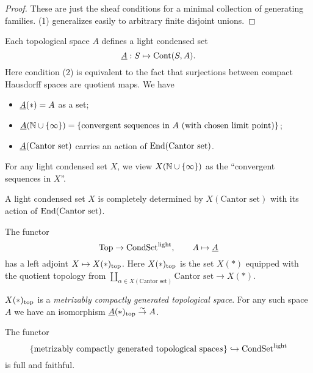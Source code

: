 \documentclass{notes}
\begin{document}
{\luca

\begin{proof}
	These are just the sheaf conditions for a minimal collection of generating families.
	(1) generalizes easily to arbitrary finite disjoint unions.
\end{proof}
}

\begin{example}
Each topological space $A$ defines a light condensed set 
$$
  \underline{A}: S\mapsto{\rm Cont}(S,A).
$$
Here condition (2) is equivalent to the fact that surjections between
compact Hausdorff spaces are quotient maps. We have
\begin{itemize}
\item $\underline{A}(*) = A$ as a set; 
\item $\underline{A}({\mathbb{N}}\cup\{\infty\}) = \{\text{convergent sequences in $A$
  (with chosen limit point)}\}$;
\item $\underline{A}(\text{Cantor set})$ carries an action of
  $\mathrm{ End}(\text{Cantor set})$. 
\end{itemize}
\end{example}

For any light condensed set $X$, we view $X({\mathbb{N}}\cup\{\infty\})$ as the
``convergent sequences in $X$''. 

\begin{remark}
A light condensed set $X$ is completely determined by $X(\text{Cantor
  set})$ with its action of $\mathrm{ End}(\text{Cantor set})$.
\end{remark}

\begin{prop}
The functor
$$
  \text{Top} \to \text{CondSet}^{\rm light},\qquad A\mapsto\underline{A}
$$
has a left adjoint $X\mapsto X(*)_{\rm top}$. Here $X(*)_{\rm top}$ is
the set $X(*)$ equipped with the quotient topology from
$\coprod_{\alpha\in X(\text{Cantor set})}\text{Cantor set} \to X(*)$.
\end{prop}

\begin{remark}
$X(*)_{\rm top}$ is a {\em metrizably compactly generated topological
  space}. For any such space $A$ we have an isomorphism
  $\underline{A}(*)_{\rm top}\stackrel{\sim}\to A$. 
\end{remark}

\begin{cor}
The functor
$$
  \{\text{metrizably compactly generated topological space}s\} \hookrightarrow
  \text{CondSet}^{\rm light}
$$
is full and faithful. 
\end{cor}
\end{document}
